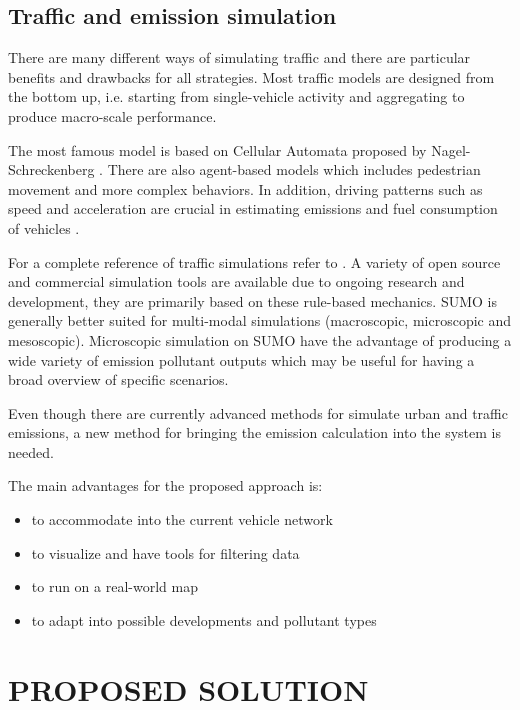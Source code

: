 \documentclass[letter, 10pt, conference]{ieeeconf}
\begin{document}
\subsection{Traffic and emission simulation}

There are many different ways of simulating traffic and there are particular benefits and drawbacks for all strategies.
Most traffic models are designed from the bottom up, i.e. starting from single-vehicle activity and aggregating to produce macro-scale performance.

The most famous model is based on Cellular Automata proposed by Nagel-Schreckenberg \cite{nagel_cellular_1992}.
There are also agent-based models which includes pedestrian movement and more complex behaviors.
In addition, driving patterns such as speed and acceleration are crucial in estimating emissions and fuel consumption of vehicles \cite{markiewicz_reduction_2017}.

For a complete reference of traffic simulations refer to \cite{kotusevski_review_nodate}.
A variety of open source and commercial simulation tools are available due to ongoing research and development, they are primarily based on these rule-based mechanics.
SUMO is generally better suited for multi-modal simulations (macroscopic, microscopic and mesoscopic).
Microscopic simulation on SUMO have the advantage of producing a wide variety of emission pollutant outputs which may be useful for having a broad overview of specific scenarios.

Even though there are currently advanced methods for simulate urban and traffic emissions, a new method for bringing the emission calculation into the system is needed.

The main advantages for the proposed approach is:
\begin{itemize}
\item to accommodate into the current vehicle network
\item to visualize and have tools for filtering data
\item to run on a real-world map
\item to adapt into possible developments and pollutant types
\end{itemize}

\section{PROPOSED SOLUTION}
\end{document}
